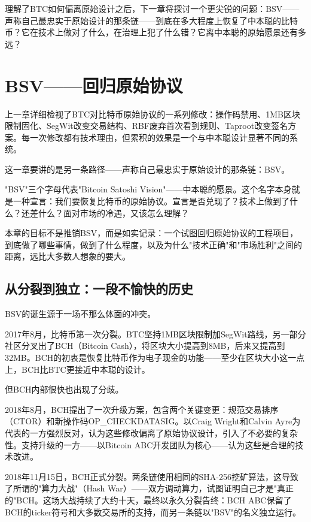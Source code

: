 \documentclass[a4paper,12pt,openany]{ctexbook}
\begin{document}
理解了BTC如何偏离原始设计之后，下一章将探讨一个更尖锐的问题：BSV——声称自己最忠实于原始设计的那条链——到底在多大程度上恢复了中本聪的比特币？它在技术上做对了什么，在治理上犯了什么错？它离中本聪的原始愿景还有多远？



\chapter{BSV——回归原始协议}


上一章详细检视了BTC对比特币原始协议的一系列修改：操作码禁用、1MB区块限制固化、SegWit改变交易结构、RBF废弃首次看到规则、Taproot改变签名方案。每一次修改都有技术理由，但累积的效果是一个与中本聪设计显著不同的系统。

这一章要讲的是另一条路径——声称自己最忠实于原始设计的那条链：BSV。

"BSV"三个字母代表"Bitcoin Satoshi Vision"——中本聪的愿景。这个名字本身就是一种宣言：我们要恢复比特币的原始协议。宣言是否兑现了？技术上做到了什么？还差什么？面对市场的冷遇，又该怎么理解？

本章的目标不是推销BSV，而是如实记录：一个试图回归原始协议的工程项目，到底做了哪些事情，做到了什么程度，以及为什么"技术正确"和"市场胜利"之间的距离，远比大多数人想象的要大。


\section*{从分裂到独立：一段不愉快的历史}


BSV的诞生源于一场不那么体面的冲突。

2017年8月，比特币第一次分裂。BTC坚持1MB区块限制加SegWit路线，另一部分社区分叉出了BCH（Bitcoin Cash），将区块大小提高到8MB，后来又提高到32MB。BCH的初衷是恢复比特币作为电子现金的功能——至少在区块大小这一点上，BCH比BTC更接近中本聪的设计。

但BCH内部很快也出现了分歧。

2018年8月，BCH提出了一次升级方案，包含两个关键变更：规范交易排序（CTOR）和新操作码OP\_CHECKDATASIG。以Craig Wright和Calvin Ayre为代表的一方强烈反对，认为这些修改偏离了原始协议设计，引入了不必要的复杂性。支持升级的一方——以Bitcoin ABC开发团队为核心——认为这些是合理的技术改进。

2018年11月15日，BCH正式分裂。两条链使用相同的SHA-256挖矿算法，这导致了所谓的"算力大战"（Hash War）——双方调动算力，试图证明自己才是"真正的"BCH。这场大战持续了大约十天，最终以永久分裂告终：BCH ABC保留了BCH的ticker符号和大多数交易所的支持，而另一条链以"BSV"的名义独立运行。
\end{document}
